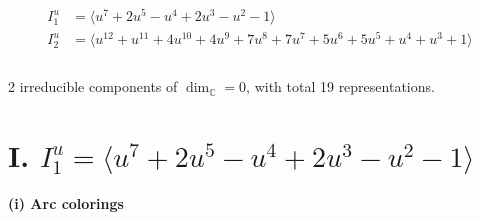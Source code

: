 \documentclass[1p]{elsarticle_modified}
\theoremstyle{definition}
\begin{document}
\begin{align*}
I^u_{1}&=\langle 
u^7+2 u^5- u^4+2 u^3- u^2-1\rangle \\
I^u_{2}&=\langle 
u^{12}+u^{11}+4 u^{10}+4 u^9+7 u^8+7 u^7+5 u^6+5 u^5+u^4+u^3+1\rangle \\
\\
\end{align*}
\raggedright * 2 irreducible components of $\dim_{\mathbb{C}}=0$, with total 19 representations.\\
\newpage
\renewcommand{\arraystretch}{1}
\centering \section*{I. $I^u_{1}= \langle u^7+2 u^5- u^4+2 u^3- u^2-1 \rangle$}
\flushleft \textbf{(i) Arc colorings}\\
\end{document}

